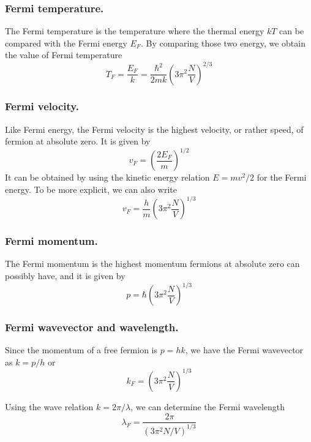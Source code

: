 \documentclass[../../../Main.tex]{subfiles}
\begin{document}
\subsubsection{Fermi temperature.} The Fermi temperature is the temperature where the thermal energy $kT$ can be compared with the Fermi energy $E_F$. By comparing those two energy, we obtain the value of Fermi temperature
\begin{equation*}
    T_F=\frac{E_F}{k}=\frac{\hbar^2}{2mk}\left(3\pi^2\frac{N}{V}\right)^{2/3}
\end{equation*}

\subsubsection{Fermi velocity.} Like Fermi energy, the Fermi velocity is the highest velocity, or rather speed, of fermion at absolute zero. It is given by 
\begin{equation*}
    v_F=\left(\frac{2E_F}{m}\right)^{1/2}
\end{equation*}
It can be obtained by using the kinetic energy relation $E=mv^2/2$ for the Fermi energy. To be more explicit, we can also write
\begin{equation*}
    v_F=\frac{h}{m}\left(3\pi^2\frac{N}{V}\right)^{1/3}
\end{equation*}

\subsubsection{Fermi momentum.} The Fermi momentum is the highest momentum fermions at absolute zero can possibly have, and it is given by 
\begin{equation*}
    p=\hbar\left(3\pi^2\frac{N}{V}\right)^{1/3}
\end{equation*}

\subsubsection{Fermi wavevector and wavelength.} Since the momentum of a free fermion is $p=hk$, we have the Fermi wavevector as $k=p/h$ or 
\begin{equation*}
    k_F=\left(3\pi^2\frac{N}{V}\right)^{1/3}
\end{equation*}

Using the wave relation $k=2\pi/\lambda$, we can determine the Fermi wavelength
\begin{equation*}
    \lambda_F=\frac{2\pi}{\left(3\pi^2N/V\right)^{1/3}}
\end{equation*}
\end{document}
